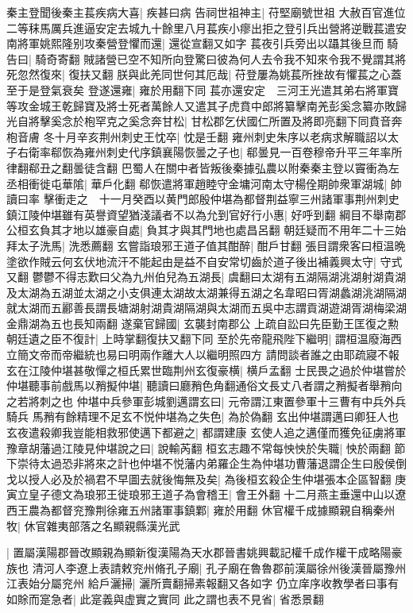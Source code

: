 秦主登聞後秦主萇疾病大喜|{
	疾甚曰病}
告祠世祖神主|{
	苻堅廟號世祖}
大赦百官進位二等秣馬厲兵進逼安定去城九十餘里八月萇疾小瘳出拒之登引兵出營將逆戰萇遣安南將軍姚熙隆别攻秦營登懼而還|{
	還從宣翻又如字}
萇夜引兵旁出以躡其後旦而騎告曰|{
	騎奇寄翻}
賊諸營已空不知所向登驚曰彼為何人去令我不知來令我不覺謂其將死忽然復來|{
	復扶又翻}
朕與此羌同世何其厄哉|{
	苻登屢為姚萇所挫故有懼萇之心蓋至于是登氣衰矣}
登遂還雍|{
	雍於用翻下同}
萇亦還安定　三河王光遣其弟右將軍寶等攻金城王乾歸寶及將士死者萬餘人又遣其子虎賁中郎將纂擊南羌彭奚念纂亦敗歸光自將擊奚念於枹罕克之奚念奔甘松|{
	甘松郡乞伏國仁所置及將即亮翻下同賁音奔枹音膚}
冬十月辛亥荆州刺史王忱卒|{
	忱是壬翻}
雍州刺史朱序以老病求解職詔以太子右衛率郗恢為雍州刺史代序鎮襄陽恢曇之子也|{
	郗曇見一百卷穆帝升平三年率所律翻郗丑之翻曇徒含翻}
巴蜀人在關中者皆叛後秦據弘農以附秦秦主登以竇衝為左丞相衝徙屯華隂|{
	華戶化翻}
郗恢遣將軍趙睦守金墉河南太守楊佺期帥衆軍湖城|{
	帥讀曰率}
擊衝走之　十一月癸酉以黄門郎殷仲堪為都督荆益寧三州諸軍事荆州刺史鎮江陵仲堪雖有英譽資望猶淺議者不以為允到官好行小惠|{
	好呼到翻}
綱目不舉南郡公桓玄負其才地以雄豪自處|{
	負其才與其門地也處昌呂翻}
朝廷疑而不用年二十三始拜太子洗馬|{
	洗悉薦翻}
玄嘗詣琅邪王道子值其酣醉|{
	酣戶甘翻}
張目謂衆客曰桓温晩塗欲作賊云何玄伏地流汗不能起由是益不自安常切齒於道子後出補義興太守|{
	守式又翻}
鬱鬱不得志歎曰父為九州伯兒為五湖長|{
	虞翻曰太湖有五湖隔湖洮湖射湖貴湖及太湖為五湖並太湖之小支俱連太湖故太湖兼得五湖之名韋昭曰胥湖蠡湖洮湖隔湖就太湖而五酈善長謂長塘湖射湖貴湖隔湖與太湖而五吳中志謂貢湖遊湖胥湖梅梁湖金鼎湖為五也長知兩翻}
遂棄官歸國|{
	玄襲封南郡公}
上疏自訟曰先臣勤王匡復之勲朝廷遺之臣不復計|{
	上時掌翻復扶又翻下同}
至於先帝龍飛陛下繼明|{
	謂桓温廢海西立簡文帝而帝繼統也易曰明兩作離大人以繼明照四方}
請問談者誰之由耶疏寢不報玄在江陵仲堪甚敬憚之桓氏累世臨荆州玄復豪横|{
	横戶孟翻}
士民畏之過於仲堪嘗於仲堪聽事前戲馬以矟擬仲堪|{
	聽讀曰廳矟色角翻通俗文長丈八者謂之矟擬者舉矟向之若將刺之也}
仲堪中兵參軍彭城劉邁謂玄曰|{
	元帝謂江東置參軍十三曹有中兵外兵騎兵}
馬矟有餘精理不足玄不悦仲堪為之失色|{
	為於偽翻}
玄出仲堪謂邁曰卿狂人也玄夜遣殺卿我豈能相救邪使邁下都避之|{
	都謂建康}
玄使人追之邁僅而獲免征虜將軍豫章胡藩過江陵見仲堪說之曰|{
	說輸芮翻}
桓玄志趣不常每怏怏於失職|{
	怏於兩翻}
節下崇待太過恐非將來之計也仲堪不悦藩内弟羅企生為仲堪功曹藩退謂企生曰殷侯倒戈以授人必及於禍君不早圖去就後悔無及矣|{
	為後桓玄殺企生仲堪張本企區智翻}
庚寅立皇子德文為琅邪王徙琅邪王道子為會稽王|{
	會王外翻}
十二月燕主垂還中山以遼西王農為都督兖豫荆徐雍五州諸軍事鎮鄴|{
	雍於用翻}
休官權千成據顯親自稱秦州牧|{
	休官雜夷部落之名顯親縣漢光武}


|{
	置屬漢陽郡晉改顯親為顯新復漢陽為天水郡晉書姚興載記權千成作權干成略陽豪族也}
清河人李遼上表請敕兖州脩孔子廟|{
	孔子廟在魯魯郡前漢屬徐州後漢晉屬豫州江表始分屬兖州}
給戶灑掃|{
	灑所賣翻掃素報翻又各如字}
仍立庠序收教學者曰事有如賖而寔急者|{
	此寔義與虚實之實同}
此之謂也表不見省|{
	省悉景翻}


